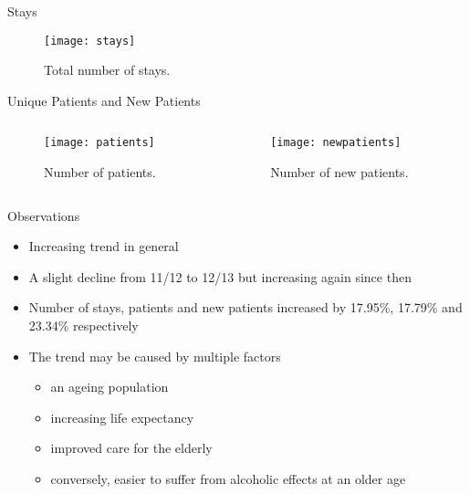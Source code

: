 \documentclass[hyperref={breaklinks,colorlinks,
   urlcolor=blue,citecolor=blue,linkcolor=red}]{beamer}
\begin{document}
\begin{frame}{Stays}
\begin{figure}
\begin{center}
\texttt{[image: stays]}
\caption{Total number of stays.}
\end{center}
\end{figure}
\end{frame}

\iffalse
\begin{frame}{Hospital Statistics}
\begin{figure}
\begin{center}
\texttt{[image: newpatients]}
\texttt{[image: patients]}
\caption{Number of patients and new patients.}
\end{center}
\end{figure}
\end{frame}
\fi

\begin{frame}{Unique Patients and New Patients}
\begin{columns}
\begin{column}{0.58\textwidth}
\begin{figure}
\begin{center}
\texttt{[image: patients]}
\caption{Number of patients.}
\end{center}
\end{figure}
\end{column}


\begin{column}{0.6\textwidth}
\begin{figure}
\begin{center}
\texttt{[image: newpatients]}
\caption{Number of new patients.}
\end{center}
\end{figure}
\end{column}
\end{columns}
\end{frame}

\begin{frame}{Observations}
\begin{itemize}
\item{Increasing trend in general}
\item{A slight decline from 11/12 to 12/13 but increasing again since then}
\item{Number of stays, patients and new patients increased by 17.95\%, 17.79\% and 23.34\% respectively}
\item{The trend may be caused by multiple factors}
\begin{itemize}
\item{an ageing population}
\item{increasing life expectancy}
\item{improved care for the elderly}
\item{conversely, easier to suffer from alcoholic effects at an older age}
\end{itemize}
\end{itemize}
\end{frame}
\end{document}
